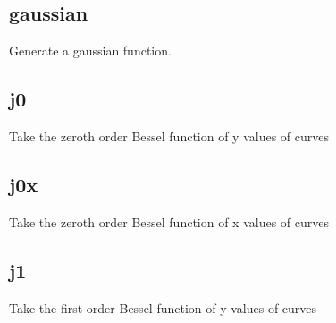\documentclass[letterpaper,10pt,english]{sphinxmanual}
\begin{document}
\subsection{gaussian}
\label{\detokenize{math_operations:gaussian}}
Generate a gaussian function.

\begin{sphinxVerbatim}[commandchars=\\\{\}]
\PYG{p}{[}\PYG{p}{]}     \PYG{p}{[}\PYG{c+c1}{\PYGZsh{} points\PYGZgt{} [\PYGZlt{}\PYGZsh{} half\PYGZhy{}widths\PYGZgt{}]]}
\end{sphinxVerbatim}


\subsection{j0}
\label{\detokenize{math_operations:j0}}
Take the zeroth order Bessel function of y values of curves

\begin{sphinxVerbatim}[commandchars=\\\{\}]
\PYG{p}{[}\PYG{p}{]}  
\end{sphinxVerbatim}


\subsection{j0x}
\label{\detokenize{math_operations:j0x}}
Take the zeroth order Bessel function of x values of curves

\begin{sphinxVerbatim}[commandchars=\\\{\}]
\PYG{p}{[}\PYG{p}{]}  
\end{sphinxVerbatim}


\subsection{j1}
\label{\detokenize{math_operations:j1}}
Take the first order Bessel function of y values of curves

\begin{sphinxVerbatim}[commandchars=\\\{\}]
\PYG{p}{[}\PYG{p}{]}  
\end{sphinxVerbatim}
\end{document}
